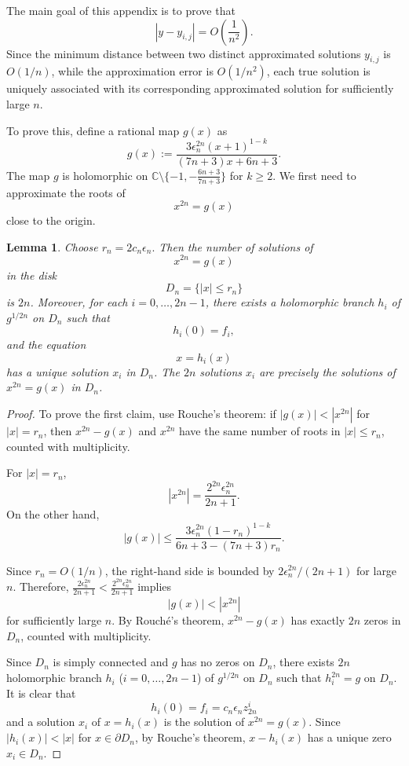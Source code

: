 \documentclass[10pt,a4paper,reqno]{amsart}
\newtheorem{lem}[thm]{Lemma}
\theoremstyle{definition}
\numberwithin{equation}{section}
\numberwithin{figure}{section}
\newcommand{\C}{\mathbb{C}}
\newcommand{\ep}{\epsilon}
\begin{document}
The main goal of this appendix is to prove that \[|y-y_{i,j}|=O\left(\frac{1}{n^2}\right).\]
Since the minimum distance between two distinct approximated solutions $y_{i,j}$ is $O(1/n)$,
while the approximation error is $O(1/n^2)$,
each true solution is uniquely associated with its corresponding approximated solution for sufficiently large $n$.

To prove this, define a rational map $g(x)$ as
\[g(x):=\frac{3{\ep_n^{2n}}(x+1)^{1-k} }{(7n+3)x+6n+3}.\]
The map $g$ is holomorphic on $\C\setminus \{ -1, -\frac{6n+3}{7n+3}\}$ for $k\ge 2$.
We first need to approximate the roots of \[x^{2n}=g(x)\]
close to the origin.

\begin{lem}\label{lem:app1}
Choose $r_n=2c_n\ep_n.$
Then the number of solutions of \[x^{2n}=g(x)\] in the disk \[D_n=\{|x|\le r_n\}\] is $2n$.
Moreover, for each $i=0,\dots,2n-1$, there exists a holomorphic branch $h_i$ of $g^{1/2n}$ on $D_n$ such that
\[h_i(0)=f_i,\]
and the equation
\[x=h_i(x)\]
has a unique solution \(x_i\) in \(D_n\).
The \(2n\) solutions \(x_i\) are precisely the solutions of
\(x^{2n}=g(x)\) in \(D_n\).
\end{lem}

\begin{proof}
To prove the first claim, use Rouche's theorem: if $|g(x)|<|x^{2n}|$ for $|x|=r_n$, then $x^{2n}-g(x)$ and $x^{2n}$ have the same number of roots in $|x|\le r_n$, counted with multiplicity.

For $|x|=r_n$, \[|x^{2n}|= \frac{2^{2n}\ep_n^{2n}}{2n+1}.\]
On the other hand,
\[|g(x)|\le\frac{3\ep_n^{2n}(1-r_n)^{1-k}}{6n+3-(7n+3)r_n}.\]

Since \(r_n=O(1/n)\), the right-hand side is bounded by \(2 \ep_n^{2n}/(2n+1)\) for large $n$.
Therefore, $\frac{2 \ep_n^{2n}}{2n+1}<\frac{2^{2n}\ep_n^{2n}}{2n+1}$ implies 
\[|g(x)|<|x^{2n}|\]
for sufficiently large \(n\).
By Rouché's theorem, \(x^{2n}-g(x)\) has exactly \(2n\) zeros in \(D_n\), counted with multiplicity.

Since $D_n$ is simply connected and $g$ has no zeros on $D_n$, 
there exists $2n$ holomorphic branch $h_i$ ($i=0,\dots, 2n-1$) of \( g^{1/2n}\) on \(D_n\) such that $h_i^{2n}=g$ on $D_n$.
It is clear that \[h_i(0)=f_i=c_n \ep_n z_{2n}^i\]
and a solution $x_i$ of $x=h_i(x)$ is the solution of $x^{2n}=g(x)$.
Since $|h_i(x)|<|x|$ for $x\in \partial D_n$, by Rouche's theorem, $x-h_i(x)$ has a unique zero $x_i\in D_n$.
\end{proof}
\end{document}
